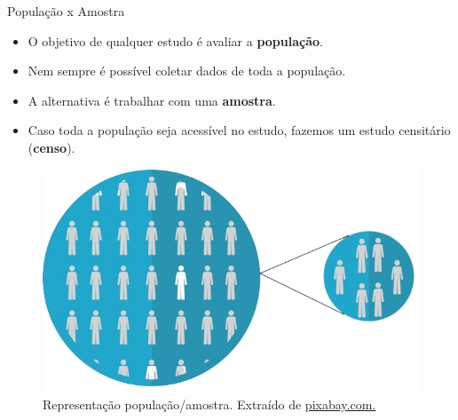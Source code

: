 \documentclass[
  ignorenonframetext,
  serif,
  professionalfont,
  usenames,
  dvipsnames,
  aspectratio = 169]{beamer}
\providecommand{\tightlist}{%
  \setlength{\itemsep}{0pt}\setlength{\parskip}{0pt}}
\renewcommand{\tightlist}{%
  \setlength{\itemsep}{0\baselineskip}
  \setlength{\parskip}{0.25\baselineskip}
}
\def\beginAHalfColumn{\begin{minipage}{0.49\textwidth}}%
\def\endColumns{\end{minipage}}%
\begin{document}
\begin{frame}{População x Amostra}
\label{populauxe7uxe3o-x-amostra}
\beginAHalfColumn

\begin{itemize}
\tightlist
\item
  O objetivo de qualquer estudo é avaliar a \textbf{população}.
\end{itemize}

\vspace{0.3cm}

\begin{itemize}
\tightlist
\item
  Nem sempre é possível coletar dados de toda a população.
\end{itemize}

\vspace{0.3cm}

\begin{itemize}
\tightlist
\item
  A alternativa é trabalhar com uma \textbf{amostra}.
\end{itemize}

\vspace{0.3cm}

\begin{itemize}
\tightlist
\item
  Caso toda a população seja acessível no estudo, fazemos um estudo
  censitário (\textbf{censo}).
\end{itemize}

\endColumns
\beginAHalfColumn

\begin{figure}

{\centering \includegraphics[width=1\linewidth]{./img/populacao-amostra3} 

}

\caption{Representação população/amostra. Extraído de \href{https://cdn.pixabay.com/photo/2017/10/25/18/18/rare-disease-2888820_1280.png}{pixabay.com.}}\label{fig:unnamed-chunk-3}
\end{figure}

\endColumns
\end{frame}
\end{document}
